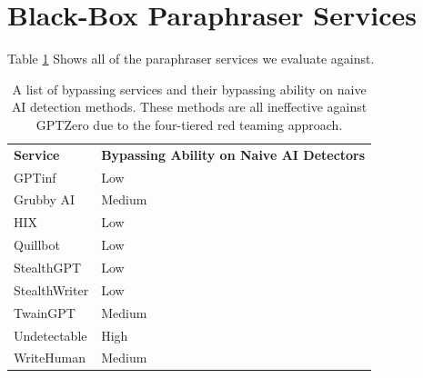 \documentclass[11pt]{article}
\begin{document}
\section{Black-Box Paraphraser Services}
\label{appendix:paraphraser_services}
Table \ref{table:paraphraser_services} Shows all of the paraphraser services we evaluate against. 
\begin{table}[t]
\centering
\small
\begin{tabular}{p{} p{}}
\toprule
\textbf{Service} & \textbf{Bypassing Ability on Naive AI Detectors} \\ 
GPTinf & Low \\
Grubby AI & Medium \\
HIX & Low\\
Quillbot & Low \\ 
StealthGPT & Low \\
StealthWriter & Low \\
TwainGPT & Medium \\ 
Undetectable & High \\ 
WriteHuman & Medium \\
\bottomrule
\end{tabular}
\caption{A list of bypassing services and their bypassing ability on naive AI detection methods. These methods are all ineffective against GPTZero due to the four-tiered red teaming approach.}
\label{table:paraphraser_services}
\end{table}
\end{document}
